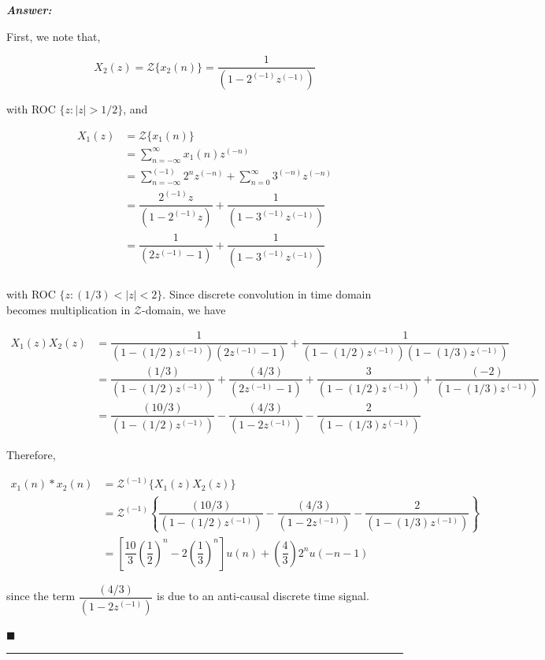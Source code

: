 \documentclass[12pt]{article}
\theoremstyle{definition}
\newenvironment{answer}{
    \textbf{\textit{Answer:}} \qquad
}{\hfill $\blacksquare$ \\ 

\begin{center}
    \rule{0.8\linewidth}{1.5px} 
    \vspace*{1cm}   
\end{center}
}
\newcommand{\zcal}{\mathcal{Z}}
\newcommand{\inv}[1][1]{^{(- #1)}}
\begin{document}
\begin{answer}
    First, we note that,

    $$
    X_2(z) = \zcal\{ x_2(n)\} = \dfrac{1}{(1 - 2\inv z\inv)}
    $$

    with ROC $\{ z : \vert z \vert > 1/2\}$, and

    \begin{align*}
        X_1(z) 
        & = \zcal\{ x_1(n) \} \\
        & = \sum_{n = -\infty}^{\infty} x_1(n)z\inv[n]\\
        & = \sum_{n = -\infty}^{(-1)} 2^n z\inv[n] + \sum_{n = 0}^{\infty} 3\inv[n] z\inv[n]\\
        & = \dfrac{2\inv z}{(1 - 2\inv z)} + \dfrac{1}{(1 - 3\inv z\inv)}\\
        & = \dfrac{1}{(2 z\inv - 1)} + \dfrac{1}{(1 - 3\inv z\inv)}\\
    \end{align*}

    with ROC $\{ z : (1/3) < \vert z \vert < 2 \}$. Since discrete convolution in time domain becomes multiplication in $\zcal$-domain, we have 

    \begin{align*}
        X_1(z)X_2(z)
        & = \dfrac{1}{(1 - (1/2) z\inv)(2 z\inv - 1)} + \dfrac{1}{(1 - (1/2) z\inv)(1 - (1/3) z\inv)}\\
        & = \dfrac{(1/3)}{(1 - (1/2) z\inv)} + \dfrac{(4/3)}{(2z\inv - 1)} + \dfrac{3}{(1 - (1/2) z\inv)} + \dfrac{(-2)}{(1 - (1/3) z\inv)}\\
        & = \dfrac{(10/3)}{(1 - (1/2) z\inv)} - \dfrac{(4/3)}{(1 - 2z\inv)} - \dfrac{2}{(1 - (1/3) z\inv)}
    \end{align*}

    Therefore,

    \begin{align*}
        x_1(n) \ast x_2(n)
        & = \zcal\inv\{ X_1(z)X_2(z) \}\\
        & = \zcal\inv\left\{ \dfrac{(10/3)}{(1 - (1/2) z\inv)} - \dfrac{(4/3)}{(1 - 2z\inv)} - \dfrac{2}{(1 - (1/3) z\inv)} \right\}\\
        & = \left[ \dfrac{10}{3} \left( \dfrac{1}{2} \right)^n - 2 \left( \dfrac{1}{3} \right)^n \right]u(n) + \left(\dfrac{4}{3}\right) 2^n u(-n-1)
    \end{align*}

    since the term $\dfrac{(4/3)}{(1 - 2z\inv)}$ is due to an anti-causal discrete time signal.

\end{answer}
\end{document}
